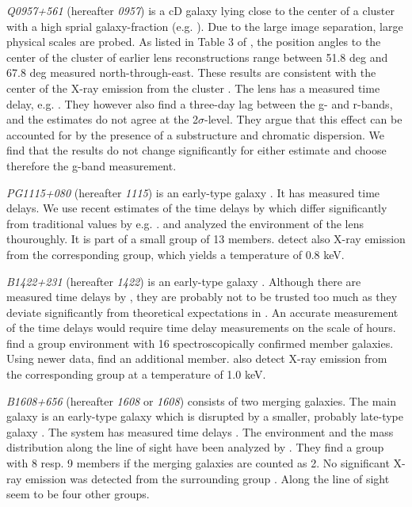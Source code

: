 \documentclass[useAMS,usenatbib]{mn2e}
\begin{document}
\textit{Q0957+561} (hereafter \textit{0957}) is a cD galaxy lying close to the center of a cluster with a high sprial galaxy-fraction (e.g. \cite{1992MNRAS.254P..27G,1994A&A...291..411A,1998ApJ...504..661C}). Due to the large image separation, large physical scales are probed. As listed in Table 3 of \cite{2000ApJ...542...74K}, the position angles to the center of the cluster of earlier lens reconstructions range between 51.8 deg and 67.8 deg measured north-through-east. These results are consistent with the center of the X-ray emission from the cluster \citep{1998ApJ...504..661C}. The lens has a measured time delay, e.g. \citep{2012A&A...540A.132S}. They however also find a three-day lag between the g- and r-bands, and the estimates do not agree at the 2$\sigma$-level. They argue that this effect can be accounted for by the presence of a substructure and chromatic dispersion. We find that the results do not change significantly for either estimate and choose therefore the g-band measurement.

\textit{PG1115+080} (hereafter \textit{1115}) is an early-type galaxy \citep{2005ApJ...626...51Y}. It has measured time delays. We use recent estimates of the time delays by \cite{2010MNRAS.406.2764T} which differ significantly from traditional values by e.g. \cite{1997ApJ...489...21B}. \cite{2006ApJ...641..169M} and \cite{2011ApJ...726...84W} analyzed the environment of the lens thouroughly. It is part of a small group of 13 members. \cite{2004ApJ...610..686G} detect also X-ray emission from the corresponding group, which yields a temperature of 0.8 keV.

\textit{B1422+231} (hereafter \textit{1422}) is an early-type galaxy \citep{1996ApJ...462L..53I}. Although there are measured time delays by \cite{2001MNRAS.326.1403P}, they are probably not to be trusted too much as they deviate significantly from theoretical expectations in \cite{2003AJ....126...29R}. An accurate measurement of the time delays would require time delay measurements on the scale of hours. \cite{2006ApJ...641..169M} find a group environment with 16 spectroscopically confirmed member galaxies. Using newer data, \cite{2011ApJ...726...84W} find an additional member. \cite{2004ApJ...610..686G} also detect X-ray emission from the corresponding group at a temperature of 1.0 keV.

\textit{B1608+656} (hereafter \textit{1608} or \textit{1608}) consists of two merging galaxies. The main galaxy is an early-type galaxy which is disrupted by a smaller, probably late-type galaxy \citep{2003ApJ...584..100S}. The system has measured time delays \citep{2002ApJ...581..823F}. The environment and the mass distribution along the line of sight have been analyzed by \cite{2006ApJ...642...30F}. They find a group with 8 resp. 9 members if the merging galaxies are counted as 2. No significant X-ray emission was detected from the surrounding group \citep{2005ApJ...625..633D}. Along the line of sight seem to be four other groups.
\end{document}
